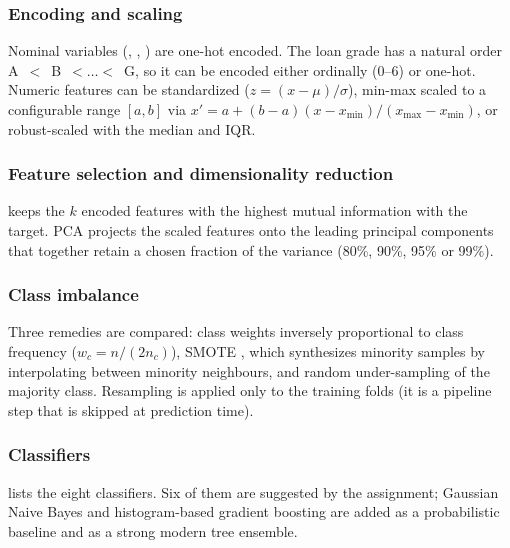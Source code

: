 \subsubsection{Encoding and scaling}
Nominal variables (, , ) are one-hot encoded.
The loan grade has a natural order A~$<$~B~$<\dots<$~G, so it can be encoded either ordinally (0--6) or one-hot.
Numeric features can be standardized ($z = (x - \mu)/\sigma$), min-max scaled to a configurable range $[a, b]$ via $x' = a + (b - a)(x - x_{\min})/(x_{\max} - x_{\min})$, or robust-scaled with the median and IQR.

\subsubsection{Feature selection and dimensionality reduction}
 keeps the $k$ encoded features with the highest mutual information with the target.
PCA \cite{jolliffe2016} projects the scaled features onto the leading principal components that together retain a chosen fraction of the variance (80\%, 90\%, 95\% or 99\%).

\subsubsection{Class imbalance}
Three remedies are compared: class weights inversely proportional to class frequency ($w_c = n / (2 n_c)$), SMOTE \cite{smote}, which synthesizes minority samples by interpolating between minority neighbours, and random under-sampling of the majority class.
Resampling is applied only to the training folds (it is a pipeline step that is skipped at prediction time).

\subsubsection{Classifiers}
 lists the eight classifiers.
Six of them are suggested by the assignment; Gaussian Naive Bayes and histogram-based gradient boosting are added as a probabilistic baseline and as a strong modern tree ensemble.

